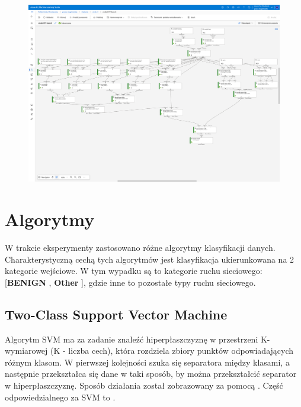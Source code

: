 \begin{landscape}
\begin{figure}[H]
    \centering
    \includegraphics[height=0.9\textwidth]{images/pipeline}
    \label{fig:pipeline}
\end{figure}
\end{landscape}

\section{Algorytmy}
W trakcie eksperymenty zastosowano różne algorytmy klasyfikacji danych. Charakterystyczną cechą tych algorytmów jest klasyfikacja ukierunkowana na 2 kategorie wejściowe. W tym wypadku są to kategorie ruchu sieciowego: [\textbf{BENIGN} , \textbf{Other} ], gdzie inne to pozostałe typy ruchu sieciowego.

\subsection{Two-Class Support Vector Machine}

Algorytm SVM ma za zadanie znaleźć hiperpłaszczyznę w przestrzeni K-wymiarowej (K - liczba cech), która rozdziela zbiory punktów odpowiadających różnym klasom. W pierwszej kolejności szuka się separatora między klasami, a następnie przekształca się dane w taki sposób, by można przekształcić separator w hiperpłaszczyznę\cite{IBM}. Sposób działania został zobrazowany za pomocą . Część  odpowiedzialnego za SVM to .

